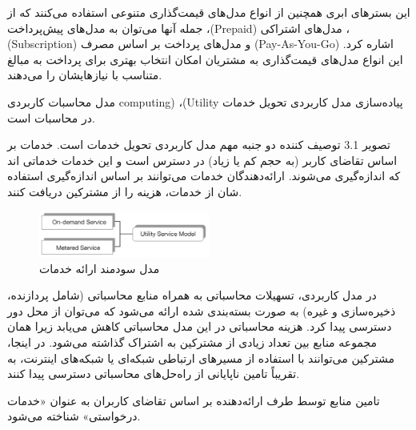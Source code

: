 \documentclass{book}
\begin{document}
\begin{addinfo2}
\begin{enumerate}
                \end{enumerate}

                این بسترهای ابری همچنین از انواع مدل‌های قیمت‌گذاری متنوعی استفاده می‌کنند که از جمله آنها می‌توان به مدل‌های پیش‌پرداخت ،(Prepaid) مدل‌های اشتراکی ،(Subscription) و مدل‌های پرداخت بر اساس مصرف (Pay-As-You-Go) اشاره کرد. این انواع مدل‌های قیمت‌گذاری به مشتریان امکان انتخاب بهتری برای پرداخت به مبالغ متناسب با نیازهایشان را می‌دهند.

            \end{addinfo2}

            \begin{addinfo}
                
                مدل محاسبات کاربردی computing) ،(Utility پیاده‌سازی مدل کاربردی تحویل خدمات در محاسبات است.

            \end{addinfo}

            تصویر 3.1 توصیف کننده دو جنبه مهم مدل کاربردی تحویل خدمات است. خدمات بر اساس تقاضای کاربر (به حجم کم یا زیاد) در دسترس است و این خدمات خدماتی اند که اندازه‌گیری می‌شوند. ارائه‌دهندگان خدمات می‌توانند بر اساس اندازه‌گیری استفاده شان از خدمات، هزینه را از مشترکین دریافت کنند.

            \begin{figure}[htbp]

                \centering
                \includegraphics[width=0.5\textwidth]{image/fig 3.1.png}
                \caption{مدل سودمند ارائه خدمات}
                \label{fig:fig_3.1}
        
            \end{figure}

            در مدل کاربردی، تسهیلات محاسباتی به همراه منابع محاسباتی (شامل پردازنده، ذخیره‌سازی و غیره) به صورت بسته‌بندی شده ارائه می‌شود که می‌توان از محل دور دسترسی پیدا کرد. هزینه محاسباتی در این مدل محاسباتی کاهش می‌یابد زیرا همان مجموعه منابع بین تعداد زیادی از مشترکین به اشتراک گذاشته می‌شود. در اینجا، مشترکین می‌توانند با استفاده از مسیرهای ارتباطی شبکه‌ای یا شبکه‌های اینترنت، به تقریباً تامین ناپایانی از راه‌حل‌های محاسباتی دسترسی پیدا کنند.

            \begin{addinfo}
                
                تامین منابع توسط طرف ارائه‌دهنده بر اساس تقاضای کاربران به عنوان «خدمات درخواستی» شناخته می‌شود.

            \end{addinfo}
\end{document}
